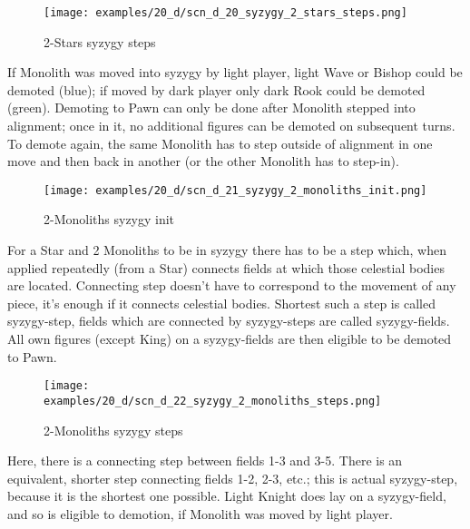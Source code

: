 \clearpage %

\noindent
\begin{figure}[!h]
\texttt{[image: examples/20\_d/scn\_d\_20\_syzygy\_2\_stars\_steps.png]}
\caption{2-Stars syzygy steps}
\label{fig:scn_d_20_syzygy_2_stars_steps}
\end{figure}

If Monolith was moved into syzygy by light player, light Wave or Bishop could be demoted (blue); if moved by
dark player only dark Rook could be demoted (green). Demoting to Pawn can only be done after Monolith stepped
into alignment; once in it, no additional figures can be demoted on subsequent turns. To demote again, the same
Monolith has to step outside of alignment in one move and then back in another (or the other Monolith has to
step-in).

\clearpage %

\noindent
\begin{figure}[!h]
\texttt{[image: examples/20\_d/scn\_d\_21\_syzygy\_2\_monoliths\_init.png]}
\caption{2-Monoliths syzygy init}
\label{fig:scn_d_21_syzygy_2_monoliths_init}
\end{figure}

For a Star and 2 Monoliths to be in syzygy there has to be a step which, when applied repeatedly (from a Star)
connects fields at which those celestial bodies are located. Connecting step doesn't have to correspond to the
movement of any piece, it's enough if it connects celestial bodies. Shortest such a step is called syzygy-step,
fields which are connected by syzygy-steps are called syzygy-fields. All own figures (except King) on a
syzygy-fields are then eligible to be demoted to Pawn.

\clearpage %

\noindent
\begin{figure}[!h]
\texttt{[image: examples/20\_d/scn\_d\_22\_syzygy\_2\_monoliths\_steps.png]}
\caption{2-Monoliths syzygy steps}
\label{fig:scn_d_22_syzygy_2_monoliths_steps}
\end{figure}

Here, there is a connecting step between fields 1-3 and 3-5. There is an equivalent, shorter step connecting fields
1-2, 2-3, etc.; this is actual syzygy-step, because it is the shortest one possible. Light Knight does lay on a
syzygy-field, and so is eligible to demotion, if Monolith was moved by light player.

